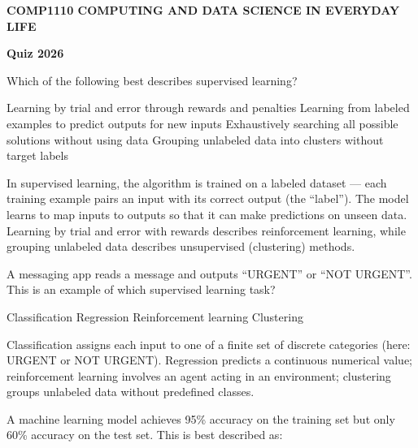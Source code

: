 \documentclass[answers]{exam}
\begin{document}
\begin{center}
    {\Large \bfseries COMP1110 COMPUTING AND DATA SCIENCE IN EVERYDAY LIFE}\par
    {\Large \bfseries Quiz 2026}
\end{center}

\begin{questions}

\question Which of the following best describes supervised learning?

\begin{choices}
    \choice Learning by trial and error through rewards and penalties
    \correctchoice Learning from labeled examples to predict outputs for new inputs
    \choice Exhaustively searching all possible solutions without using data
    \choice Grouping unlabeled data into clusters without target labels
\end{choices}

\begin{solution}
    In supervised learning, the algorithm is trained on a labeled dataset --- each training example pairs an input with its correct output (the ``label''). The model learns to map inputs to outputs so that it can make predictions on unseen data.
    Learning by trial and error with rewards describes reinforcement learning, while grouping unlabeled data describes unsupervised (clustering) methods.
\end{solution}

\question A messaging app reads a message and outputs ``URGENT'' or ``NOT URGENT''. This is an example of which supervised learning task?

\begin{oneparchoices}
    \correctchoice Classification
    \choice Regression
    \choice Reinforcement learning
    \choice Clustering
\end{oneparchoices}

\begin{solution}
    Classification assigns each input to one of a finite set of discrete categories (here: URGENT or NOT URGENT).
    Regression predicts a continuous numerical value; reinforcement learning involves an agent acting in an environment; clustering groups unlabeled data without predefined classes.
\end{solution}

\question A machine learning model achieves 95\% accuracy on the training set but only 60\% accuracy on the test set. This is best described as:


\end{questions}
\end{document}
